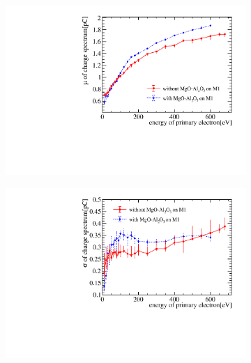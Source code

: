 \begin{figure}[!ht]
	\centering
	\begin{subfigure}[b]{0.325\textwidth}
		\centering
		\includegraphics[width=\textwidth]{PMTRelated/GTmodel/gain_mu.pdf}
		\caption{}
		\label{fig:gain}
	\end{subfigure}
	\hfill
	\begin{subfigure}[b]{0.325\textwidth}
		\centering
		\includegraphics[width=\textwidth]{PMTRelated/GTmodel/gain_sigma.pdf}
		\caption{}
		\label{fig:sigma}
	\end{subfigure}
	\hfill
	\begin{subfigure}[b]{0.325\textwidth}
		\centering

\end{subfigure}
\end{figure}
